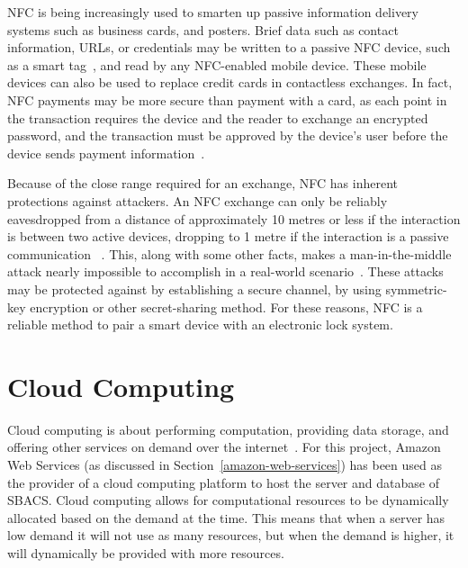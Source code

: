 \documentclass[12pt]{report}
\let\Oldsection\section
\renewcommand{\section}{\FloatBarrier\Oldsection}
\begin{document}
NFC is being increasingly used to smarten up passive information delivery systems such as business cards, and posters.
Brief data such as contact information, URLs, or credentials may be written to a passive NFC device, such as a smart
tag~\autocite{NFCFORUMWHATIS}, and read by any NFC-enabled mobile device. These mobile devices can also be used to
replace credit cards in contactless exchanges. In fact, NFC payments may be more secure than payment with a card, as
each point in the transaction requires the device and the reader to exchange an encrypted password, and the transaction
 must be approved by the device's user before the device sends payment information~\autocite{NFCPAYMENT}.

Because of the close range required for an exchange, NFC has inherent protections against attackers. An NFC exchange
can only be reliably eavesdropped from a distance of approximately 10 metres or less if the interaction is between two 
active devices, dropping to 1 metre if the interaction is a passive communication ~\autocite{NFCSECURITY}. This, along 
with some other facts, makes a man-in-the-middle attack nearly impossible to accomplish in a real-world 
scenario~\autocite{NFCSECURITY}. These attacks may be protected against by establishing a secure channel, by using 
symmetric-key encryption or other secret-sharing method. For these reasons, NFC is a reliable method to pair a smart 
device with an electronic lock system.


\section{Cloud Computing} \label{cloud-computing}

Cloud computing is about performing computation, providing data storage, and offering other services
on demand over the internet~\autocite{CLOUDCOMPUTING}. For this project, Amazon Web Services (as discussed
in Section~\ref{amazon-web-services})
has been used as the provider of a cloud computing platform to host the server and database of SBACS.
Cloud computing allows for computational resources to be dynamically allocated based on the demand
at the time. This means that when a server has low demand it will not use as many resources, but when
the demand is higher, it will dynamically be provided with more resources.

\end{document}
